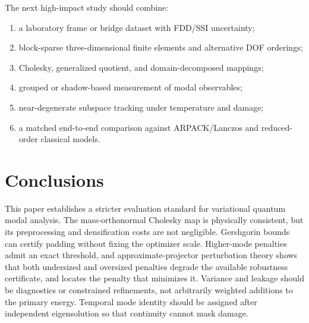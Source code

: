 \documentclass{ieeeaccess}
\begin{document}
The next high-impact study should combine:
\begin{enumerate}[label=(\roman*)]
\item a laboratory frame or bridge dataset with FDD/SSI uncertainty;
\item block-sparse three-dimensional finite elements and alternative DOF orderings;
\item Cholesky, generalized quotient, and domain-decomposed mappings;
\item grouped or shadow-based measurement of modal observables;
\item near-degenerate subspace tracking under temperature and damage;
\item a matched end-to-end comparison against ARPACK/Lanczos and reduced-order classical models.
\end{enumerate}

\section{Conclusions}
\label{sec:conclusion}

This paper establishes a stricter evaluation standard for variational quantum modal analysis. The mass-orthonormal Cholesky map is physically consistent, but its preprocessing and densification costs are not negligible. Gershgorin bounds can certify padding without fixing the optimizer scale. Higher-mode penalties admit an exact threshold, and approximate-projector perturbation theory shows that both undersized and oversized penalties degrade the available robustness certificate, and locates the penalty that minimizes it. Variance and leakage should be diagnostics or constrained refinements, not arbitrarily weighted additions to the primary energy. Temporal mode identity should be assigned after independent eigensolution so that continuity cannot mask damage.
\end{document}
